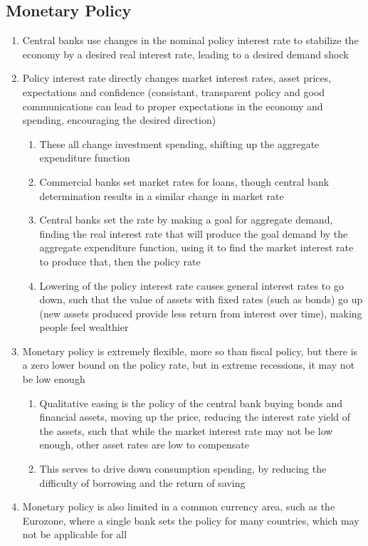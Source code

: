 \documentclass[11 pt, twoside]{article}
\begin{document}
\subsection{Monetary Policy}
\begin{enumerate}
\item Central banks use changes in the nominal policy interest rate to stabilize the economy by a desired real interest rate, leading to a desired demand shock
\item Policy interest rate directly changes market interest rates, asset prices, expectations and confidence (consistant, transparent policy and good communications can lead to proper expectations in the economy and spending, encouraging the desired direction)
\begin{enumerate}
\item These all change investment spending, shifting up the aggregate expenditure function
\item Commercial banks set market rates for loans, though central bank determination results in a similar change in market rate
\item Central banks set the rate by making a goal for aggregate demand, finding the real interest rate that will produce the goal demand by the aggregate expenditure function, using it to find the market interest rate to produce that, then the policy rate
\item Lowering of the policy interest rate causes general interest rates to go down, such that the value of assets with fixed rates (such as bonds) go up (new assets produced provide less return from interest over time), making people feel wealthier
\end{enumerate}
\item Monetary policy is extremely flexible, more so than fiscal policy, but there is a zero lower bound on the policy rate, but in extreme recessions, it may not be low enough
\begin{enumerate}
\item Qualitative easing is the policy of the central bank buying bonds and financial assets, moving up the price, reducing the interest rate yield of the assets, such that while the market interest rate may not be low enough, other asset rates are low to compensate 
\item This serves to drive down consumption spending, by reducing the difficulty of borrowing and the return of saving
\end{enumerate}
\item Monetary policy is also limited in a common currency area, such as the Eurozone, where a single bank sets the policy for many countries, which may not be applicable for all

\end{enumerate}
\end{document}

